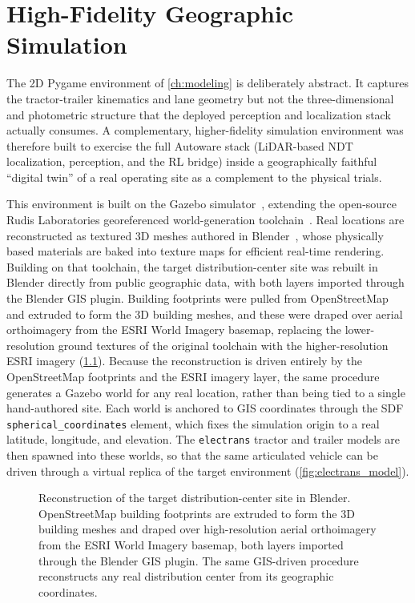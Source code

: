 \chapter{High-Fidelity Geographic Simulation}
\label{app:geo_sim}

The 2D Pygame environment of \cref{ch:modeling} is deliberately abstract. It captures the tractor-trailer kinematics and lane geometry but not the three-dimensional and photometric structure that the deployed perception and localization stack actually consumes. A complementary, higher-fidelity simulation environment was therefore built to exercise the full Autoware stack (LiDAR-based NDT localization, perception, and the RL bridge) inside a geographically faithful ``digital twin'' of a real operating site as a complement to the physical trials.

This environment is built on the Gazebo simulator~\cite{koenig2004gazebo}, extending the open-source Rudis Laboratories georeferenced world-generation toolchain~\cite{perseghetti2021rudisworlds}. Real locations are reconstructed as textured 3D meshes authored in Blender~\cite{blender}, whose physically based materials are baked into texture maps for efficient real-time rendering. Building on that toolchain, the target distribution-center site was rebuilt in Blender directly from public geographic data, with both layers imported through the Blender GIS plugin. Building footprints were pulled from OpenStreetMap~\cite{openstreetmap} and extruded to form the 3D building meshes, and these were draped over aerial orthoimagery from the ESRI World Imagery basemap, replacing the lower-resolution ground textures of the original toolchain with the higher-resolution ESRI imagery (\cref{fig:geo_sim_blender}). Because the reconstruction is driven entirely by the OpenStreetMap footprints and the ESRI imagery layer, the same procedure generates a Gazebo world for any real location, rather than being tied to a single hand-authored site. Each world is anchored to GIS coordinates through the SDF \texttt{spherical\_coordinates} element, which fixes the simulation origin to a real latitude, longitude, and elevation. The \texttt{electrans} tractor and trailer models are then spawned into these worlds, so that the same articulated vehicle can be driven through a virtual replica of the target environment (\cref{fig:electrans_model}).

\begin{figure}[H]
    \centering
    \caption{Reconstruction of the target distribution-center site in Blender. OpenStreetMap building footprints are extruded to form the 3D building meshes and draped over high-resolution aerial orthoimagery from the ESRI World Imagery basemap, both layers imported through the Blender GIS plugin. The same GIS-driven procedure reconstructs any real distribution center from its geographic coordinates.}
    \label{fig:geo_sim_blender}
\end{figure}

